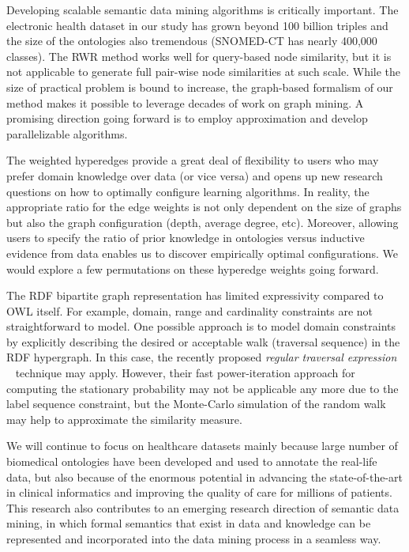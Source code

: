 Developing scalable semantic data mining algorithms is critically important. The electronic health dataset in our study has grown beyond 100 billion triples and the size of the ontologies also tremendous (SNOMED-CT has nearly 400,000 classes). The RWR method works well for query-based node similarity, but it is not applicable to generate full pair-wise node similarities at such scale. While the size of practical problem is bound to increase, the graph-based formalism of our method makes it possible to leverage decades of work on graph mining. A promising direction going forward is to employ approximation and develop parallelizable algorithms.

The weighted hyperedges provide a great deal of flexibility to users who may prefer domain knowledge over data (or vice versa) and opens up new research questions on how to optimally configure learning algorithms. In reality, the appropriate ratio for the edge weights is not only dependent on the size of graphs but also the graph configuration (depth, average degree, etc). Moreover, allowing users to specify the ratio of prior knowledge in ontologies versus inductive evidence from data enables us to discover empirically optimal configurations. We would explore a few permutations on these hyperedge weights going forward.

The RDF bipartite graph representation has limited expressivity compared to OWL itself. For example, domain, range and cardinality constraints are not straightforward to model.  One possible approach is to model domain constraints by explicitly describing the desired or acceptable walk (traversal sequence) in the RDF hypergraph. In this case, the recently proposed \emph{regular traversal expression} ~\cite{Marko10} technique may apply. However, their fast power-iteration approach for computing the stationary probability may not be applicable any more due to the label sequence constraint, but the Monte-Carlo simulation of the random walk may help to approximate the similarity measure.

We will continue to focus on healthcare datasets mainly because large number of biomedical ontologies have been developed and used to annotate the real-life data, but also because of the enormous potential in advancing the state-of-the-art in clinical informatics and improving the quality of care for millions of patients. This research also contributes to an emerging research direction of semantic data mining, in which formal semantics that exist in data and knowledge can be represented and incorporated into the data mining process in a seamless way.



